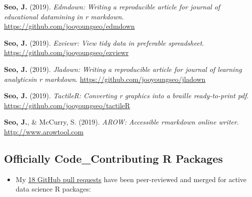\documentclass[11pt, a4paper]{awesome-cv}
\providecommand{\tightlist}{%
	\setlength{\itemsep}{0pt}\setlength{\parskip}{0pt}}
\begin{document}
\hypertarget{refs_github_projects}{}
\leavevmode\hypertarget{ref-R-edmdown}{}%
\textbf{Seo, J.} (2019). \emph{Edmdown: Writing a reproducible article for journal of educational datamining in r markdown}. \url{https://github.com/jooyoungseo/edmdown}

\leavevmode\hypertarget{ref-R-ezviewr}{}%
\textbf{Seo, J.} (2019). \emph{Ezviewr: View tidy data in preferable spreadsheet}. \url{https://github.com/jooyoungseo/ezviewr}

\leavevmode\hypertarget{ref-R-jladown}{}%
\textbf{Seo, J.} (2019). \emph{Jladown: Writing a reproducible article for journal of learning analyticsin r markdown}. \url{https://github.com/jooyoungseo/jladown}

\leavevmode\hypertarget{ref-R-tactileR}{}%
\textbf{Seo, J.} (2019). \emph{TactileR: Converting r graphics into a braille ready-to-print pdf}. \url{https://github.com/jooyoungseo/tactileR}

\leavevmode\hypertarget{ref-webrender}{}%
\textbf{Seo, J.}, \& McCurry, S. (2019). \emph{AROW: Accessible rmarkdown online writer}. \url{http://www.arowtool.com}

\endgroup

\hypertarget{officially-code_contributing-r-packages}{%
\subsection{Officially Code\_Contributing R Packages}\label{officially-code_contributing-r-packages}}

\begin{itemize}
\tightlist
\item
  My \href{https://github.com/pulls?q=is\%3Apr+author\%3Ajooyoungseo+archived\%3Afalse+is\%3Aclosed}{18 GitHub pull requests} have been peer-reviewed and merged for active data science R packages:
\end{itemize}
\end{document}

